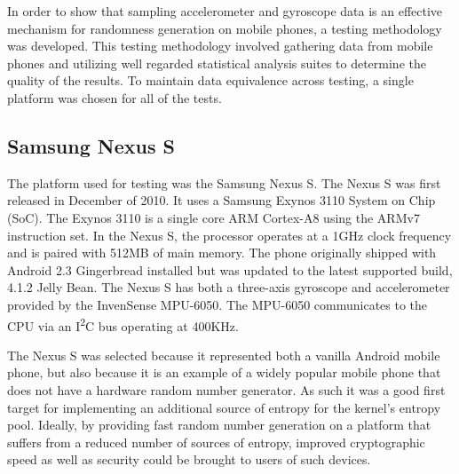 
In order to show that sampling accelerometer and gyroscope data is an effective
mechanism for randomness generation on mobile phones, a testing methodology was
developed. This testing methodology involved gathering data from mobile phones
and utilizing well regarded statistical analysis suites to determine the quality
of the results. To maintain data equivalence across testing, a single platform
was chosen for all of the tests. 

\subsection{Samsung Nexus S}

The platform used for testing was the Samsung Nexus S. The Nexus S was first
released in December of 2010. It uses a Samsung Exynos 3110 System on Chip
(SoC). The Exynos 3110 is a single core ARM Cortex-A8 using the ARMv7
instruction set. In the Nexus S, the processor operates at a 1GHz clock
frequency and is paired with 512MB of main memory. The phone originally shipped
with Android 2.3 Gingerbread installed but was updated to the latest supported
build, 4.1.2 Jelly Bean.  The Nexus S has both a three-axis gyroscope and
accelerometer provided by the InvenSense MPU-6050. The MPU-6050 communicates to
the CPU via an I\textsuperscript{2}C bus operating at 400KHz. 

The Nexus S was selected because it represented both a vanilla Android mobile
phone, but also because it is an example of a widely popular mobile phone that
does not have a hardware random number generator. As such it was a good first
target for implementing an additional source of entropy for the kernel's entropy
pool. Ideally, by providing fast random number generation on a platform that
suffers from a reduced number of sources of entropy, improved cryptographic
speed as well as security could be brought to users of such devices.


